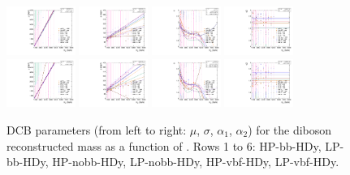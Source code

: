\begin{figure}[htbp]
  \includegraphics[width=0.2\textwidth]{fig/analysisAppendix/paramSignalShape_allSig_MVV_HP_vbf_HDy_MEAN.pdf}
  \includegraphics[width=0.2\textwidth]{fig/analysisAppendix/paramSignalShape_allSig_MVV_HP_vbf_HDy_SIGMA.pdf}
  \includegraphics[width=0.2\textwidth]{fig/analysisAppendix/paramSignalShape_allSig_MVV_HP_vbf_HDy_ALPHA1.pdf}
  \includegraphics[width=0.2\textwidth]{fig/analysisAppendix/paramSignalShape_allSig_MVV_HP_vbf_HDy_ALPHA2.pdf}\\
  \includegraphics[width=0.2\textwidth]{fig/analysisAppendix/paramSignalShape_allSig_MVV_LP_vbf_HDy_MEAN.pdf}
  \includegraphics[width=0.2\textwidth]{fig/analysisAppendix/paramSignalShape_allSig_MVV_LP_vbf_HDy_SIGMA.pdf}
  \includegraphics[width=0.2\textwidth]{fig/analysisAppendix/paramSignalShape_allSig_MVV_LP_vbf_HDy_ALPHA1.pdf}
  \includegraphics[width=0.2\textwidth]{fig/analysisAppendix/paramSignalShape_allSig_MVV_LP_vbf_HDy_ALPHA2.pdf}\\
  \caption{
    DCB parameters (from left to right: $\mu$, $\sigma$, $\alpha_1$, $\alpha_2$) for the diboson reconstructed mass \MVV as a function of \MX.
    Rows 1 to 6: HP-bb-HDy, LP-bb-HDy, HP-nobb-HDy, LP-nobb-HDy, HP-vbf-HDy, LP-vbf-HDy.
  }
  \label{fig:MVVShapeParam_HDy}
\end{figure}

